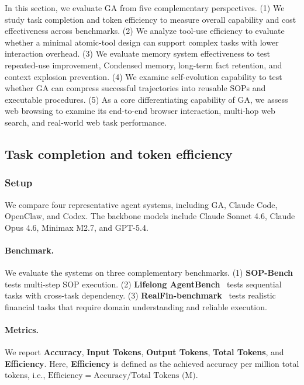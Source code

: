 

\label{sec:exp_task_completion}
In this section, we evaluate GA from five complementary perspectives. 
(1) We study task completion and token efficiency to measure overall capability and cost effectiveness across benchmarks. 
(2) We analyze tool-use efficiency to evaluate whether a minimal atomic-tool design can support complex tasks with lower interaction overhead. 
(3) We evaluate memory system effectiveness to test repeated-use improvement, Condensed memory, long-term fact retention, and context explosion prevention. 
(4) We examine self-evolution capability to test whether GA can compress successful trajectories into reusable SOPs and executable procedures. 
(5) As a core differentiating capability of GA, we assess web browsing to examine its end-to-end browser interaction, multi-hop web search, and real-world web task performance.
\subsection{Task completion and token efficiency}
\subsubsection{Setup}
\label{sec:exp_task_completion_setup}
We compare four representative agent systems, including GA, Claude Code, OpenClaw, and Codex. The backbone models include Claude Sonnet 4.6, Claude Opus 4.6, Minimax M2.7, and GPT-5.4.

\paragraph{Benchmark.}
We evaluate the systems on three complementary benchmarks. (1) \textbf{SOP-Bench}~\citep{sopbench} tests multi-step SOP execution. (2) \textbf{Lifelong AgentBench}~\citep{lifelongagentbench} tests sequential tasks with cross-task dependency. (3) \textbf{RealFin-benchmark}~\citep{realfin} tests realistic financial tasks that require domain understanding and reliable execution.


\paragraph{Metrics.}
We report \textbf{Accuracy}, \textbf{Input Tokens}, \textbf{Output Tokens}, \textbf{Total Tokens}, and \textbf{Efficiency}. Here, \textbf{Efficiency} is defined as the achieved accuracy per million total tokens, i.e., $\text{Efficiency}=\text{Accuracy}/\text{Total Tokens (M)}$. 


